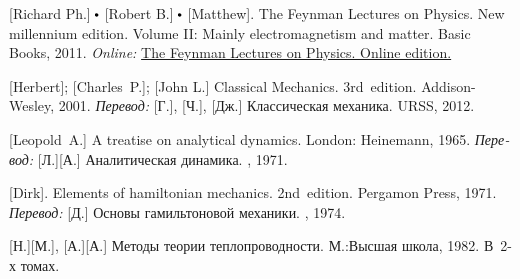 \begin{thebibliography}{123}
\begin{otherlanguage}{russian}
[Richard Ph.] ${\hspace{-0.2ex}\bigdot}$ [Robert B.] ${\hspace{-0.2ex}\bigdot}$ [Matthew]. The Feynman Lectures on Physics. New millennium edition. Volume II: Mainly electromagnetism and matter. Basic Books, 2011. 
\emph{Online:}
\href{http://www.feynmanlectures.caltech.edu/}{The Feynman Lectures on Physics. Online edition.}

%

[Herbert]; [Charles~P.]; [John L.] Classical Mechanics. 3rd~edition. Addison\hbox{-}Wesley, 2001. 
\emph{Перевод:} [Г.], [Ч.], [Дж.] Классическая механика. URSS, 2012. 


[Leopold~A.] A treatise on analytical dynamics.
London: Heinemann, 1965. 
\emph{Перевод:} [Л.][А.] Аналитическая динамика. \naukapublisher, 1971. 

[Dirk]. Elements of hamiltonian mechanics. 2nd~edition. Pergamon Press, 1971. 
\emph{Перевод:} [Д.] Основы гамильтоновой механики. \naukapublisher, 1974. 

[Н.][М.], [А.][А.] Методы теории теплопроводности. М.:\;Высшая школа, 1982. В~2\hbox{-}х томах.


\end{otherlanguage}
\end{thebibliography}
